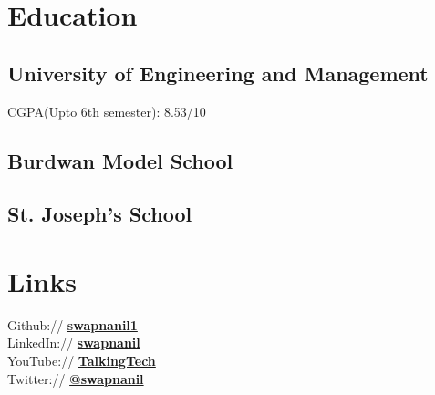 \documentclass[]{swapnanil-resume}
\begin{document}
%
%

%
%
%
%

\begin{minipage}[t]{0.33\textwidth} 


\section{Education} 

\subsection{University of Engineering and Management}
CGPA(Upto 6th semester): 8.53/10

\sectionsep

\subsection{Burdwan Model
School}

\sectionsep

\subsection{St. Joseph's School}

\sectionsep


\section{Links} 
Github:// \href{https://github.com/swapnanil1}{\bf swapnanil1} \\
LinkedIn://  \href{https://www.linkedin.com/in/swapnanil-chakraborty-046887294/}{\bf swapnanil} \\
YouTube://  \href{https://www.youtube.com/@TalkingTechTeam}{\bf TalkingTech} \\
Twitter://  \href{https://twitter.com/swapnanil111}{\bf @swapnanil} \\


\end{minipage}
\end{document}
